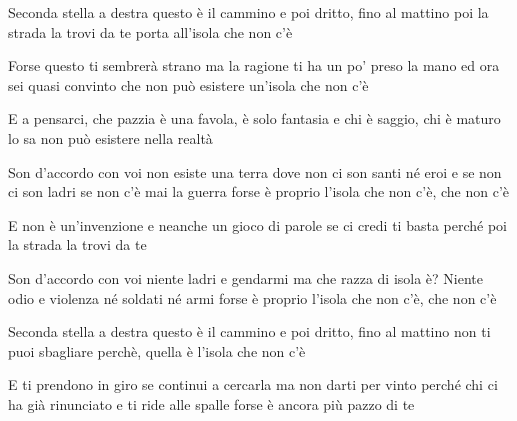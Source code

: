 
\beginverse

Seconda stella a destra
questo è il cammino
e poi dritto, fino al mattino
poi la strada la trovi da te
porta all'isola che non c'è 

\endverse

\chordsoff

\beginverse

Forse questo ti sembrerà strano
ma la ragione
ti ha un po' preso la mano
ed ora sei quasi convinto che 
non può esistere un'isola che non c'è 

\endverse

\beginverse

E a pensarci, che pazzia
è una favola, è solo fantasia
e chi è saggio, chi è maturo lo sa
non può esistere nella realtà

\endverse

\chordson

\beginchorus

Son d'accordo con voi
non esiste una terra
dove non ci son santi né eroi
e se non ci son ladri
se non c'è mai la guerra
forse è proprio l'isola
che non c'è, che non c'è 

\endchorus

\chordsoff

\beginverse

E non è un'invenzione
e neanche un gioco di parole
se ci credi ti basta perché
poi la strada la trovi da te  

\endverse

\beginchorus

Son d'accordo con voi
niente ladri e gendarmi
ma che razza di isola è?
Niente odio e violenza
né soldati né armi
forse è proprio l'isola
che non c'è, che non c'è 

\endchorus

\chordson

\beginverse

Seconda stella a destra
questo è il cammino
e poi dritto, fino al mattino
non ti puoi sbagliare perchè,
quella è l'isola che non c'è

\endverse

\beginchorus

E ti prendono in giro
se continui a cercarla
ma non darti per vinto perché
chi ci ha già rinunciato
e ti ride alle spalle
forse è ancora più pazzo di te 

\endchorus 

\endsong

